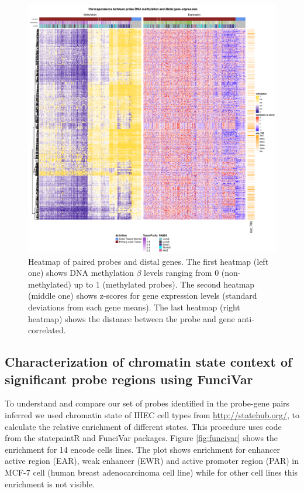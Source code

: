 \begin{figure}[ht!]
\centering
\includegraphics[width=1.0\textwidth]{images/heatmap.png}
\caption{\label{fig:heatmap} Heatmap of paired probes and distal genes. The first heatmap (left one) shows DNA methylation $\beta$ levels ranging from 0 (non-methylated) up to 1 (methylated probes).
The second heatmap (middle one) shows z-scores for gene expression levels (standard deviations from each gene means). The last heatmap (right heatmap) shows the distance between the probe
and gene anti-correlated.}
\end{figure}

\clearpage


\clearpage

\subsection*{Characterization of chromatin state context of significant probe regions using FunciVar}

To understand and compare our set of probes identified in the probe-gene pairs inferred
we used chromatin state of IHEC cell types
from \url{http://statehub.org/}, to calculate the relative enrichment of
different states.
This procedure uses code from the statepaintR \cite{statepaintr} and FunciVar \cite{funcivar} packages.
Figure \ref{fig:funcivar} shows the enrichment for 14 encode cells lines.
The plot shows enrichment for enhancer active region (EAR), weak enhancer (EWR)
and active promoter region (PAR) in MCF-7 cell (human breast adenocarcinoma cell line)
while for other cell lines this enrichment is not visible.

